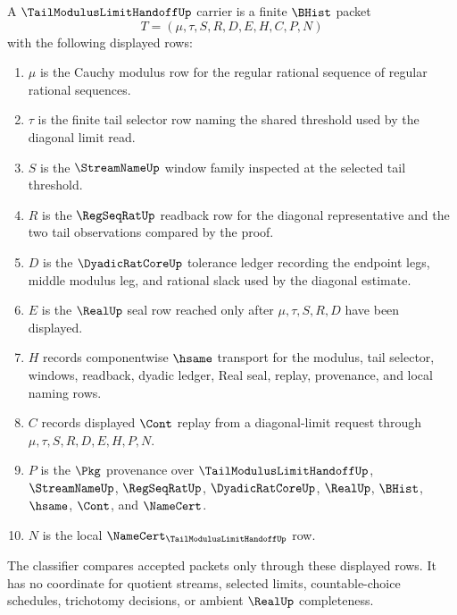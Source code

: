 \begin{definition}
\label{def:tail-modulus-limit-handoff-carrier}
A $\TailModulusLimitHandoffUp$ carrier is a finite $\BHist$ packet
$$
T=(\mu,\tau,S,R,D,E,H,C,P,N)
$$
with the following displayed rows:
\begin{enumerate}
\item $\mu$ is the Cauchy modulus row for the regular rational sequence of regular rational sequences.
\item $\tau$ is the finite tail selector row naming the shared threshold used by the diagonal limit read.
\item $S$ is the $\StreamNameUp$ window family inspected at the selected tail threshold.
\item $R$ is the $\RegSeqRatUp$ readback row for the diagonal representative and the two tail observations compared by the proof.
\item $D$ is the $\DyadicRatCoreUp$ tolerance ledger recording the endpoint legs, middle modulus leg, and rational slack used by the diagonal estimate.
\item $E$ is the $\RealUp$ seal row reached only after $\mu,\tau,S,R,D$ have been displayed.
\item $H$ records componentwise $\hsame$ transport for the modulus, tail selector, windows, readback, dyadic ledger, Real seal, replay, provenance, and local naming rows.
\item $C$ records displayed $\Cont$ replay from a diagonal-limit request through $\mu,\tau,S,R,D,E,H,P,N$.
\item $P$ is the $\Pkg$ provenance over $\TailModulusLimitHandoffUp$, $\StreamNameUp$, $\RegSeqRatUp$, $\DyadicRatCoreUp$, $\RealUp$, $\BHist$, $\hsame$, $\Cont$, and $\NameCert$.
\item $N$ is the local $\NameCert_{\TailModulusLimitHandoffUp}$ row.
\end{enumerate}
The classifier compares accepted packets only through these displayed rows. It has no coordinate for quotient streams, selected limits, countable-choice schedules, trichotomy decisions, or ambient $\RealUp$ completeness.
\end{definition}


